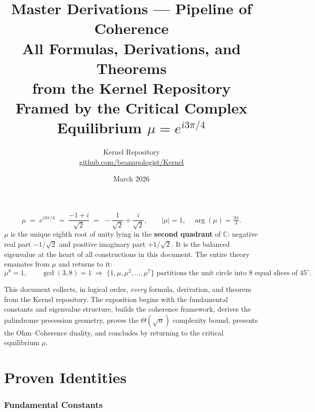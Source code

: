 \documentclass[12pt,a4paper]{article}
\title{%
  \textbf{Master Derivations — Pipeline of Coherence}\\[0.5em]
  \large All Formulas, Derivations, and Theorems\\
  from the Kernel Repository\\[0.4em]
  \normalsize Framed by the Critical Complex Equilibrium
  $\mu = e^{i3\pi/4}$
}
\author{%
  Kernel Repository\\
  \href{https://github.com/beanapologist/Kernel}{github.com/beanapologist/Kernel}
}
\date{March 2026}
\theoremstyle{plain}
\theoremstyle{definition}
\theoremstyle{remark}
\newcommand{\C}{\mathbb{C}}
\newcommand{\abs}[1]{\lvert #1 \rvert}
\begin{document}
\maketitle
\tableofcontents
\newpage


\begin{tcolorbox}[equilibrium, title={Critical Complex Equilibrium}]
\begin{equation}
\boxed{
  \mu \;=\; e^{i3\pi/4}
      \;=\; \frac{-1 + i}{\sqrt{2}}
      \;=\; -\frac{1}{\sqrt{2}} + \frac{i}{\sqrt{2}},
      \qquad \abs{\mu} = 1,\quad \arg(\mu) = \tfrac{3\pi}{4}.
}
\label{eq:mu-def}
\end{equation}
\vspace{2pt}
$\mu$ is the unique eighth root of unity lying in the \textbf{second quadrant}
of $\C$: negative real part $-1/\sqrt{2}$ and positive imaginary part
$+1/\sqrt{2}$.  It is the balanced eigenvalue at the heart of all constructions
in this document.  The entire theory emanates from $\mu$ and returns to it:
\[
  \mu^8 = 1,\qquad \gcd(3,8)=1 \;\Rightarrow\; \{1,\mu,\mu^2,\ldots,\mu^7\}
  \text{ partitions the unit circle into 8 equal slices of }45^\circ.
\]
\end{tcolorbox}

\bigskip

This document collects, in logical order, \emph{every} formula, derivation,
and theorem from the Kernel repository.  The exposition begins with the
fundamental constants and eigenvalue structure, builds the coherence framework,
derives the palindrome precession geometry, proves the $\Theta(\sqrt{n})$
complexity bound, presents the Ohm--Coherence duality, and concludes by
returning to the critical equilibrium $\mu$.

\part{Proven Identities}
\label{part:proven}

\section{Fundamental Constants}
\label{sec:constants}
\end{document}
